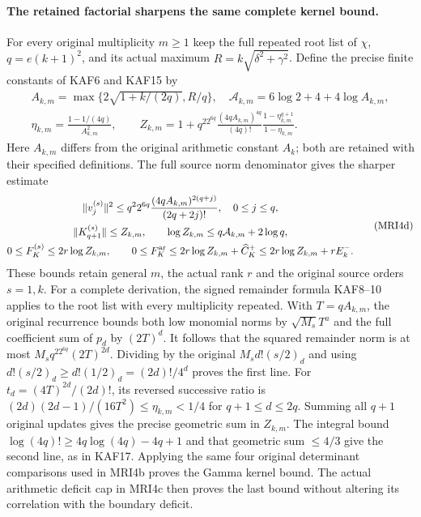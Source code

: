 \documentclass[11pt,a4paper]{article}
\begin{document}
\paragraph{The retained factorial sharpens the same complete kernel bound.}
For every original multiplicity $m\ge1$ keep the full repeated
root list of $\chi$, $q=e(k+1)^2$, and its actual maximum
$R=k\sqrt{\delta^2+\gamma^2}$. Define the precise finite
constants of KAF6 and KAF15 by
\[
\begin{gathered}
 A_{k,m}=\max\{2\sqrt{1+k/(2q)},R/q\},\quad
 \mathcal A_{k,m}=6\log2+4+4\log A_{k,m},\\
 \eta_{k,m}=\frac{1-1/(4q)}{A_{k,m}^2},\qquad
 Z_{k,m}=1+q^22^{6q}\frac{(4qA_{k,m})^{4q}}{(4q)!}
                 \frac{1-\eta_{k,m}^{q+1}}{1-\eta_{k,m}}.
\end{gathered}
\]
Here $A_{k,m}$ differs from the original arithmetic constant
$A_k$; both are retained with their specified definitions.
The full source norm denominator gives the sharper estimate
\[
\begin{gathered}
 \|v_j^{(s)}\|^2\le
 q^22^{6q}\frac{(4qA_{k,m})^{2(q+j)}}{(2q+2j)!},\quad0\le j\le q,\\
 \|K_{q+1}^{(s)}\|\le Z_{k,m},\qquad
 \log Z_{k,m}\le q\mathcal A_{k,m}+2\log q,\\
 0\le F_K^{(s)}\le2r\log Z_{k,m},\qquad
 0\le F_K^{\rm ar}\le2r\log Z_{k,m}+\widehat C_K^+
                            \le2r\log Z_{k,m}+rE_k^-.
\end{gathered}\tag{MRI4d}
\]
These bounds retain general $m$, the actual rank $r$ and
the original source orders $s=1,k$. For a complete derivation,
the signed remainder formula KAF8--10 applies to the root
list with every multiplicity repeated. With $T=qA_{k,m}$,
the original recurrence bounds both low monomial norms by
$\sqrt{M_s}T^a$ and the full coefficient sum of $p_d$ by
$(2T)^d$. It follows that the squared remainder norm is
at most $M_sq^22^{6q}(2T)^{2d}$. Dividing by the original
$M_sd!(s/2)_d$ and using
$d!(s/2)_d\ge d!(1/2)_d=(2d)!/4^d$ proves the first line.
For $t_d=(4T)^{2d}/(2d)!$, its reversed successive ratio is
$(2d)(2d-1)/(16T^2)\le\eta_{k,m}<1/4$ for
$q+1\le d\le2q$. Summing all $q+1$ original updates gives
the precise geometric sum in $Z_{k,m}$. The integral bound
$\log(4q)!\ge4q\log(4q)-4q+1$ and that geometric sum
$\le4/3$ give the second line, as in KAF17. Applying the
same four original determinant comparisons used in MRI4b
proves the Gamma kernel bound. The actual arithmetic deficit
cap in MRI4c then proves the last bound without altering its
correlation with the boundary deficit.
\end{document}
